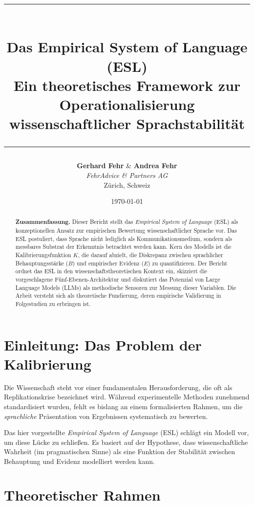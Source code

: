 \documentclass[11pt, a4paper]{article}
\title{
    \vspace{-2cm}
    \rule{\linewidth}{0.5mm}\\[0.4cm]
    {\huge \bfseries \color{eslblue} Das Empirical System of Language (ESL)}\\[0.2cm]
    {\Large Ein theoretisches Framework zur Operationalisierung}\\[0.1cm]
    {\Large wissenschaftlicher Sprachstabilität}\\[0.4cm]
    \rule{\linewidth}{0.5mm}
}
\author{
    \textbf{Gerhard Fehr} \& \textbf{Andrea Fehr}\\
    \textit{FehrAdvice \& Partners AG}\\
    \small Zürich, Schweiz
}
\date{\today}
\begin{document}
\maketitle

\begin{abstract}
    \noindent \textbf{Zusammenfassung.} Dieser Bericht stellt das \textit{Empirical System of Language} (ESL) als konzeptionellen Ansatz zur empirischen Bewertung wissenschaftlicher Sprache vor. Das ESL postuliert, dass Sprache nicht lediglich als Kommunikationsmedium, sondern als messbares Substrat der Erkenntnis betrachtet werden kann. Kern des Modells ist die Kalibrierungsfunktion $K$, die darauf abzielt, die Diskrepanz zwischen sprachlicher Behauptungsstärke ($B$) und empirischer Evidenz ($E$) zu quantifizieren. Der Bericht ordnet das ESL in den wissenschaftstheoretischen Kontext ein, skizziert die vorgeschlagene Fünf-Ebenen-Architektur und diskutiert das Potenzial von Large Language Models (LLMs) als methodische Sensoren zur Messung dieser Variablen. Die Arbeit versteht sich als theoretische Fundierung, deren empirische Validierung in Folgestudien zu erbringen ist.
\end{abstract}

\tableofcontents
\newpage

\section{Einleitung: Das Problem der Kalibrierung}

Die Wissenschaft steht vor einer fundamentalen Herausforderung, die oft als \glqq Replikationskrise\grqq{} bezeichnet wird. Während experimentelle Methoden zunehmend standardisiert wurden, fehlt es bislang an einem formalisierten Rahmen, um die \textit{sprachliche} Präsentation von Ergebnissen systematisch zu bewerten.

Das hier vorgestellte \textit{Empirical System of Language} (ESL) schlägt ein Modell vor, um diese Lücke zu schließen. Es basiert auf der Hypothese, dass wissenschaftliche \glqq Wahrheit\grqq{} (im pragmatischen Sinne) als eine Funktion der Stabilität zwischen Behauptung und Evidenz modelliert werden kann.

\section{Theoretischer Rahmen}
\end{document}
